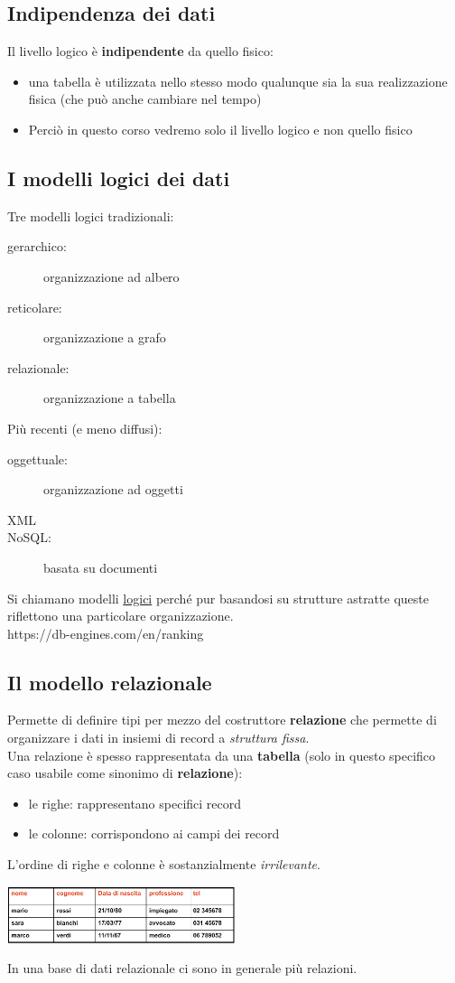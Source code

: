 \subsection{Indipendenza dei dati}
Il livello logico è \textbf{indipendente} da quello fisico:
\begin{itemize}
    \item una tabella è utilizzata nello stesso modo qualunque sia la sua realizzazione fisica (che può anche cambiare nel tempo)
    \item Perciò in questo corso vedremo solo il livello logico e non quello fisico
\end{itemize}

\subsection{I modelli logici dei dati}
Tre modelli logici tradizionali:
\begin{description}
    \item[gerarchico:] organizzazione ad albero
    \item[reticolare:] organizzazione a grafo
    \item[relazionale:] organizzazione a tabella
\end{description}
Più recenti (e meno diffusi):
\begin{description}
    \item[oggettuale:] organizzazione ad oggetti
    \item[XML] 
    \item[NoSQL:] basata su documenti
\end{description}
Si chiamano modelli \underline{logici} perché pur basandosi su strutture astratte queste riflettono una particolare organizzazione.
\\https://db-engines.com/en/ranking


\subsection{Il modello relazionale}
Permette di definire tipi per mezzo del costruttore \textbf{relazione} che permette di organizzare i dati in insiemi di record a \textit{struttura fissa}.
\\Una relazione è spesso rappresentata da una \textbf{tabella} (solo in questo specifico caso usabile come sinonimo di \textbf{relazione}):
\begin{itemize}
    \item le righe: rappresentano specifici record
    \item le colonne: corrispondono ai campi dei record
\end{itemize}
L'ordine di righe e colonne è sostanzialmente \textit{irrilevante}.
\begin{center}
    \includegraphics[width=0.5\textwidth]{img/MR_intro1.jpg}
\end{center}
In una base di dati relazionale ci sono in generale più relazioni.


